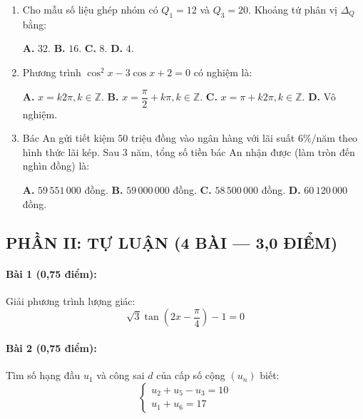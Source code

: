 \documentclass[12pt, a4paper]{article}
\begin{document}
\begin{enumerate}[leftmargin=1.5em]
    \item Cho mẫu số liệu ghép nhóm có $Q_1 = 12$ và $Q_3 = 20$. Khoảng tứ phân vị $\Delta_Q$ bằng:
    \begin{center}
    \textbf{A.} $32$. \qquad \textbf{B.} $16$. \qquad \textbf{C.} $8$. \qquad \textbf{D.} $4$.
    \end{center}

    \item Phương trình $\cos^2 x - 3\cos x + 2 = 0$ có nghiệm là:
    \begin{center}
    \textbf{A.} $x = k2\pi, k \in \mathbb{Z}$. \qquad \textbf{B.} $x = \dfrac{\pi}{2} + k\pi, k \in \mathbb{Z}$. \qquad \textbf{C.} $x = \pi + k2\pi, k \in \mathbb{Z}$. \qquad \textbf{D.} Vô nghiệm.
    \end{center}

    \item Bác An gửi tiết kiệm $50$ triệu đồng vào ngân hàng với lãi suất $6\%$/năm theo hình thức lãi kép. Sau $3$ năm, tổng số tiền bác An nhận được (làm tròn đến nghìn đồng) là:
    \begin{center}
    \textbf{A.} $59\,551\,000$ đồng. \qquad \textbf{B.} $59\,000\,000$ đồng. \qquad \textbf{C.} $58\,500\,000$ đồng. \qquad \textbf{D.} $60\,120\,000$ đồng.
    \end{center}
\end{enumerate}

\subsection*{PHẦN II: TỰ LUẬN (4 BÀI --- 3,0 ĐIỂM)}

\paragraph{Bài 1 (0,75 điểm):}
Giải phương trình lượng giác:
$$\sqrt{3}\tan\left(2x - \dfrac{\pi}{4}\right) - 1 = 0$$

\paragraph{Bài 2 (0,75 điểm):}
Tìm số hạng đầu $u_1$ và công sai $d$ của cấp số cộng $(u_n)$ biết:
$$\begin{cases} u_2 + u_5 - u_3 = 10 \\ u_1 + u_6 = 17 \end{cases}$$
\end{document}
